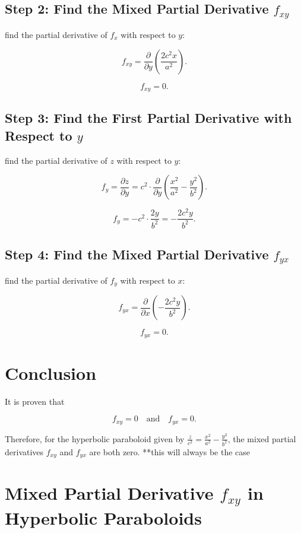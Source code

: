 \documentclass{article}
\begin{document}
\subsection{Step 2: Find the Mixed Partial Derivative \( f_{xy} \)}

find the partial derivative of \( f_x \) with respect to \( y \):

\[
f_{xy} = \frac{\partial}{\partial y} \left( \frac{2c^2 x}{a^2} \right).
\]

\[
f_{xy} = 0.
\]

\subsection{Step 3: Find the First Partial Derivative with Respect to \( y \)}

find the partial derivative of \( z \) with respect to \( y \):

\[
f_y = \frac{\partial z}{\partial y} = c^2 \cdot \frac{\partial}{\partial y} \left( \frac{x^2}{a^2} - \frac{y^2}{b^2} \right).
\]

\[
f_y = -c^2 \cdot \frac{2y}{b^2} = -\frac{2c^2 y}{b^2}.
\]

\subsection*{Step 4: Find the Mixed Partial Derivative \( f_{yx} \)}

find the partial derivative of \( f_y \) with respect to \( x \):

\[
f_{yx} = \frac{\partial}{\partial x} \left( -\frac{2c^2 y}{b^2} \right).
\]

\[
f_{yx} = 0.
\]

\section*{Conclusion}

It is proven that

\[
f_{xy} = 0 \quad \text{and} \quad f_{yx} = 0.
\]

Therefore, for the hyperbolic paraboloid given by \( \frac{z}{c^2} = \frac{x^2}{a^2} - \frac{y^2}{b^2} \), the mixed partial derivatives \( f_{xy} \) and \( f_{yx} \) are both zero. **this will always be the case  


\section{Mixed Partial Derivative \( f_{xy} \) in Hyperbolic Paraboloids}
\end{document}
